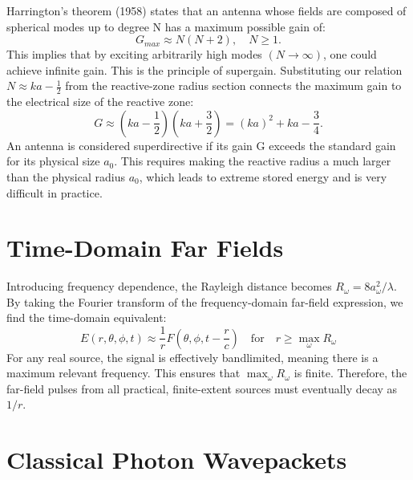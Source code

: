 \documentclass[11pt,a4paper]{article}
\begin{document}
Harrington's theorem (1958) states that an antenna whose fields are composed of spherical modes up to degree N has a maximum possible gain of:
\begin{equation}
    G_{max} \approx N(N+2), \quad N\ge1.
\end{equation}
This implies that by exciting arbitrarily high modes \((N\rightarrow\infty)\), one could achieve infinite gain. This is the principle of supergain. Substituting our relation \(N\approx ka-\frac{1}{2}\) from the reactive-zone radius section connects the maximum gain to the electrical size of the reactive zone:
\begin{equation}
    G\approx\left(ka-\frac{1}{2}\right)\left(ka+\frac{3}{2}\right)=(ka)^{2}+ka-\frac{3}{4}.
\end{equation}
An antenna is considered superdirective if its gain G exceeds the standard gain for its physical size \(a_{0}\). This requires making the reactive radius a much larger than the physical radius \(a_{0}\), which leads to extreme stored energy and is very difficult in practice.

\section{Time-Domain Far Fields}

Introducing frequency dependence, the Rayleigh distance becomes \(R_{\omega}=8a_{\omega}^{2}/\lambda\). By taking the Fourier transform of the frequency-domain far-field expression, we find the time-domain equivalent:
\begin{equation}
    E(r,\theta,\phi,t)\approx\frac{1}{r}F\left(\theta,\phi,t-\frac{r}{c}\right) \quad \text{for} \quad r\ge \max_{\omega}R_{\omega}
\end{equation}
For any real source, the signal is effectively bandlimited, meaning there is a maximum relevant frequency. This ensures that \(\max_{\omega}R_{\omega}\) is finite. Therefore, the far-field pulses from all practical, finite-extent sources must eventually decay as \(1/r\).

\section{Classical Photon Wavepackets}
\end{document}
